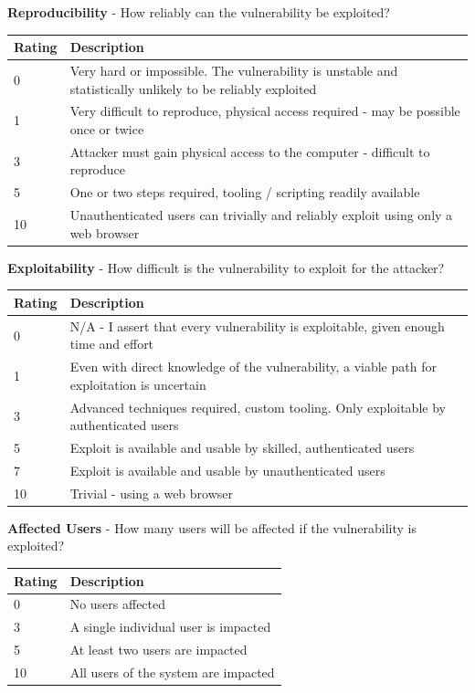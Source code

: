 \documentclass [11pt, proquest] {uwthesis}[2020/02/24]
\begin{document}
\begin{table}[H]
\label{dread:repro}
\raggedright
\textbf{Reproducibility} - How reliably can the vulnerability be exploited?
\begin{tabular}{|m{1.5cm}|p{15cm} |}
\hline
Rating & Description \\
\hline
0 &  Very hard or impossible. The vulnerability is unstable and statistically unlikely to be reliably exploited \\
\hline
1 &  Very difficult to reproduce, physical access required  - may be possible once or twice  \\
\hline
3 &  Attacker must gain physical access to the computer - difficult to reproduce \\
\hline
5 &  One or two steps required, tooling / scripting readily available       \\
\hline
10 & Unauthenticated users can trivially and reliably exploit using only a web browser \\
\hline
\end{tabular}
\end{table}

\begin{table}[H]
\label{dread:exploit}
\raggedright
\textbf{Exploitability} - How difficult is the vulnerability to exploit for the attacker?
\begin{tabular}{|m{1.5cm}|p{15cm} |}
\hline
Rating & Description \\
\hline
0 &  N/A - I assert that every vulnerability is exploitable, given enough time and effort \\
\hline
1 &   Even with direct knowledge of the vulnerability, a viable path for exploitation is uncertain  \\
\hline
3 &  Advanced techniques required, custom tooling. Only exploitable by authenticated users \\
\hline
5 &  Exploit is available and usable by skilled, authenticated users \\
\hline
7 &  Exploit is available and usable by unauthenticated users \\
\hline
10 & Trivial - using a web browser  \\
\hline
\end{tabular}
\end{table}

\begin{table}[H]
\label{dread:affect}
\raggedright
\textbf{Affected Users} - How many users will be affected if the vulnerability is exploited?
\begin{tabular}{|m{1.5cm}|p{15cm} |}
\hline
Rating & Description \\
\hline
0 &   No users affected \\
\hline
3 &  A single individual user is impacted  \\
\hline
5 &  At least two users are impacted \\
\hline
10 &  All users of the system are impacted \\
\hline
\end{tabular}
\end{table}
\end{document}
